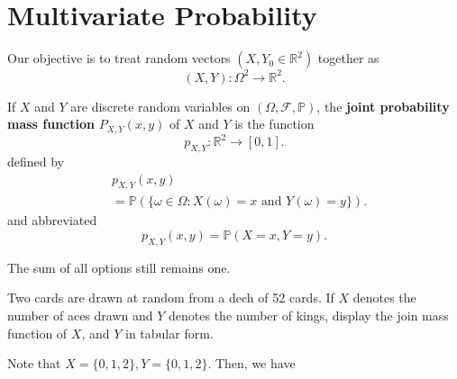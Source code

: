 
\section{Multivariate Probability}

Our objective is to treat random vectors \( (X,Y_{0} \in \mathbb{R}^{2} ) \) together as \[
	(X,Y) : \Omega ^{2} \to \mathbb{R}^{2} 
.\] 

\begin{definition}
	If \( X \) and \( Y \) are discrete random variables on \( (\Omega , \mathcal{F}, \mathbb{P}) \), the \textbf{joint probability mass function} \( P_{X,Y}(x,y) \) of \( X \) and \( Y \) is the function \[
		p_{X,Y} : \mathbb{R}^{2} \to [0, 1]
	.\] defined by 
	\begin{align*}
		&p_{X,Y}(x, y) \\ &= \mathbb{P}(\{\omega  \in \Omega : X(\omega ) = x \text{ and } Y(\omega )=y\}  )
	.\end{align*}
	and abbreviated \[
		p_{X,Y}(x, y) = \mathbb{P}(X=x, Y=y)
	.\] 
\end{definition}

\begin{note}
	The sum of all options still remains one.
\end{note}

\begin{eg}
	Two cards are drawn at random from a dech of 52 cards. If \( X \) denotes the number of aces drawn and \( Y \) denotes the number of kings, display the join mass function of \( X \), and \( Y \) in tabular form.
\end{eg}
\begin{explanation}
	Note that \( X = \{0,1,2\}, Y=\{0,1,2\}     \). Then, we have \begin{vmatrix}
		
	\end{vmatrix}
\end{explanation}
